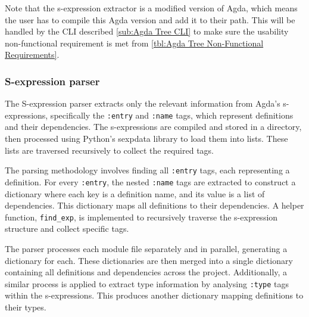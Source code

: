 Note that the s-expression extractor is a modified version of Agda, which means
the user has to compile this Agda version and add it to their path. This will
be handled by the CLI described \cref{sub:Agda Tree CLI} to make sure the
usability non-functional requirement is met from \cref{tbl:Agda Tree
Non-Functional Requirements}.

\subsubsection{S-expression parser}\label{sub:s-expression parser implementation}

The S-expression parser extracts only the relevant information
from Agda's s-expressions, specifically the \texttt{:entry} and \texttt{:name} tags, which
represent definitions and their dependencies. The s-expressions
are compiled and stored in a directory, then processed using Python's sexpdata
library to load them into lists. These lists are traversed recursively to
collect the required tags.

The parsing methodology involves finding all \texttt{:entry} tags, each
representing a definition. For every \texttt{:entry}, the nested \texttt{:name}
tags are extracted to construct a dictionary where each key is a definition
name, and its value is a list of dependencies. This dictionary maps all
definitions to their dependencies. A helper function, \texttt{find\_exp}, is
implemented to recursively traverse the s-expression structure and collect
specific tags.

The parser processes each module file separately and in parallel, generating a
dictionary for each. These dictionaries are then merged into a single
dictionary containing all definitions and dependencies across the project.
Additionally, a similar process is applied to extract type information by
analysing \texttt{:type} tags within the s-expressions. This produces another
dictionary mapping definitions to their types.


